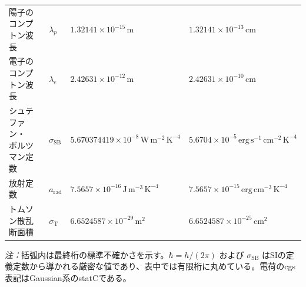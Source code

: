 {\begin{longtable}{@{}p{4.0cm}p{1.4cm}p{5.75cm}p{4.45cm}@{}}
陽子のコンプトン波長 & $\lambda_p$ & $1.32141\times10^{-15}\,\mathrm m$ & $1.32141\times10^{-13}\,\mathrm{cm}$ \\
電子のコンプトン波長 & $\lambda_e$ & $2.42631\times10^{-12}\,\mathrm m$ & $2.42631\times10^{-10}\,\mathrm{cm}$ \\
\shortstack[l]{シュテファン・\\ボルツマン定数} & $\sigma_{\mathrm{SB}}$ & $5.670374419\times10^{-8}\,\mathrm{W\,m^{-2}\,K^{-4}}$ & $5.6704\times10^{-5}\,\mathrm{erg\,s^{-1}\,cm^{-2}\,K^{-4}}$ \\
放射定数 & $a_{\mathrm{rad}}$ & $7.5657\times10^{-16}\,\mathrm{J\,m^{-3}\,K^{-4}}$ & $7.5657\times10^{-15}\,\mathrm{erg\,cm^{-3}\,K^{-4}}$ \\
トムソン散乱断面積 & $\sigma_{\mathrm T}$ & $6.6524587\times10^{-29}\,\mathrm{m^2}$ & $6.6524587\times10^{-25}\,\mathrm{cm^2}$ \\
\end{longtable}
}
\noindent\footnotesize\textit{注：}括弧内は最終桁の標準不確かさを示す。$\hbar=h/(2\pi)$ および $\sigma_{\mathrm{SB}}$ はSIの定義定数から導かれる厳密な値であり、表中では有限桁に丸めている。電荷のcgs表記はGaussian系のstatCである。\normalsize

